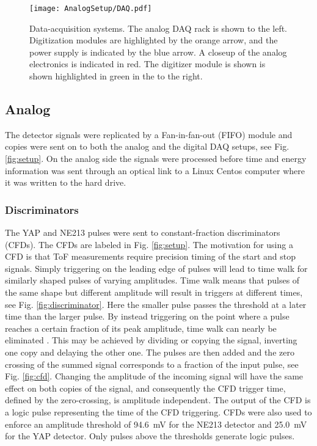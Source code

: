 \documentclass[main.tex]{subfiles}
\begin{document}
\begin{figure}[h]
    \centering
        \texttt{[image: AnalogSetup/DAQ.pdf]}
        \caption[Data-acquisition systems.]{Data-acquisition systems. The analog DAQ rack is shown to the left. Digitization modules are highlighted by the orange arrow, and the power supply is indicated by the blue arrow. A closeup of the analog electronics is indicated in red. The digitizer module is shown is shown highlighted in green in the to the right.}
    \label{fig:DAQ}
\end{figure}

\subsection{Analog}
The detector signals were replicated by a Fan-in-fan-out (FIFO) module and copies were sent on to both the analog and the digital DAQ setups, see Fig. \ref{fig:setup}. On the analog side the signals were processed before time and energy information was sent through an optical link to a Linux Centos computer where it was written to the hard drive. 

\subsubsection{Discriminators}
The YAP and NE213 pulses were sent to constant-fraction discriminators (CFDs). The CFDs are labeled  in Fig. \ref{fig:setup}. The motivation for using a CFD is that ToF measurements require precision timing of the start and stop signals. Simply triggering on the leading edge of pulses will lead to time walk for similarly shaped pulses of varying amplitudes. Time walk means that pulses of the same shape but different amplitude will result in triggers at different times, see Fig. \ref{fig:discriminator}. Here the smaller pulse passes the threshold at a later time than the larger pulse. By instead triggering on the point where a pulse reaches a certain fraction of its peak amplitude, time walk can nearly be eliminated \cite{Leo}. This may be achieved by dividing or copying the signal, inverting one copy and delaying the other one. The pulses are then added and the zero crossing of the summed signal corresponds to a fraction of the input pulse, see Fig. \ref{fig:cfd}. Changing the amplitude of the incoming signal will have the same effect on both copies of the signal, and consequently the CFD trigger time, defined by the zero-crossing, is amplitude independent. The output of the CFD is a logic pulse representing the time of the CFD triggering. CFDs were also used to enforce an amplitude threshold of \SI{94.6}{mV} for the NE213 detector and \SI{25.0}{mV} for the YAP detector. Only pulses above the thresholds generate logic pulses.
\end{document}
